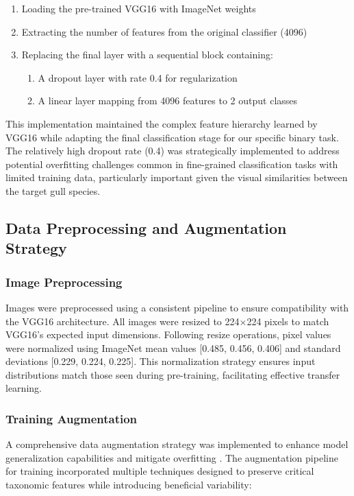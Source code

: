 \documentclass[a4paper,12pt]{article}
\begin{document}
\begin{enumerate}
    \item Loading the pre-trained VGG16 with ImageNet weights
    \item Extracting the number of features from the original classifier (4096)
    \item Replacing the final layer with a sequential block containing:
    \begin{enumerate}
        \item A dropout layer with rate 0.4 for regularization
        \item A linear layer mapping from 4096 features to 2 output classes
    \end{enumerate}
\end{enumerate}

This implementation maintained the complex feature hierarchy learned by VGG16 while adapting the final classification stage for our specific binary task. The relatively high dropout rate (0.4) was strategically implemented to address potential overfitting challenges common in fine-grained classification tasks with limited training data, particularly important given the visual similarities between the target gull species.

\subsection{Data Preprocessing and Augmentation Strategy}

\subsubsection{Image Preprocessing}

Images were preprocessed using a consistent pipeline to ensure compatibility with the VGG16 architecture. All images were resized to 224$\times$224 pixels to match VGG16's expected input dimensions. Following resize operations, pixel values were normalized using ImageNet mean values [0.485, 0.456, 0.406] and standard deviations [0.229, 0.224, 0.225]. This normalization strategy ensures input distributions match those seen during pre-training, facilitating effective transfer learning.

\subsubsection{Training Augmentation}

A comprehensive data augmentation strategy was implemented to enhance model generalization capabilities and mitigate overfitting \citep{shorten2019survey}. The augmentation pipeline for training incorporated multiple techniques designed to preserve critical taxonomic features while introducing beneficial variability:
\end{document}
